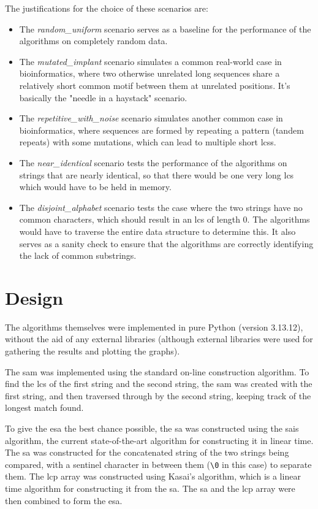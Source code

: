 The justifications for the choice of these scenarios are:
\begin{itemize}
    \item The \textit{random\_uniform} scenario serves as a baseline for the performance of the algorithms on completely random data.
    \item The \textit{mutated\_implant} scenario simulates a common real-world case in bioinformatics, where two otherwise unrelated long sequences share a relatively short common motif between them at unrelated positions\cite{interspersedrepeats,transposons}. It's basically the "needle in a haystack" scenario.
    \item The \textit{repetitive\_with\_noise} scenario simulates another common case in bioinformatics, where sequences are formed by repeating a pattern (tandem repeats\cite{tandemrepeats}) with some mutations, which can lead to multiple short \acrshort{lcs}s.
    \item The \textit{near\_identical} scenario tests the performance of the algorithms on strings that are nearly identical, so that there would be one very long \acrshort{lcs} which would have to be held in memory.
    \item The \textit{disjoint\_alphabet} scenario tests the case where the two strings have no common characters, which should result in an \acrshort{lcs} of length 0. The algorithms would have to traverse the entire data structure to determine this.
It also serves as a sanity check to ensure that the algorithms are correctly identifying the lack of common substrings.
\end{itemize}

\section{Design}
The algorithms themselves were implemented in pure Python (version 3.13.12), without the aid of any external libraries 
(although external libraries were used for gathering the results and plotting the graphs).

The \acrshort{sam} was implemented using the standard on-line construction algorithm\cite{sammake}.
To find the \acrshort{lcs} of the first string and the second string, the \acrshort{sam} was created with the first string, 
and then traversed through by the second string, keeping track of the longest match found.

To give the \acrfull{esa} the best chance possible, the \acrshort{sa} was constructed using the \acrfull{sais} algorithm, 
the current state-of-the-art algorithm for constructing it in linear time\cite{sais}.
The \acrshort{sa} was constructed for the concatenated string of the two strings being compared, 
with a \gls{sentinel} character in between them (\texttt{\textbackslash0} in this case) to separate them.
The \acrshort{lcp} array was constructed using Kasai's algorithm\cite{kasai}, which is a linear time algorithm for constructing it from the \acrshort{sa}.
The \acrshort{sa} and the \acrshort{lcp} array were then combined to form the \acrshort{esa}.

